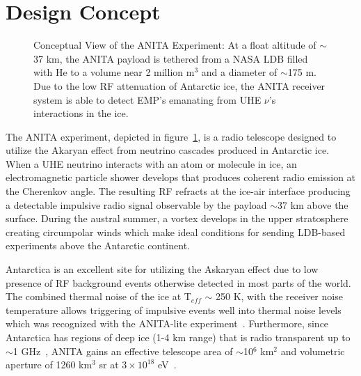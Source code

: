 \section{Design Concept}
\label{s:design}

\begin{figure}[htbp]
\centering
\epsfxsize=4.0in
\caption{Conceptual View of the ANITA Experiment:  At a float altitude of $\sim$37 km, the ANITA payload is tethered from a NASA LDB filled with He to a volume near 2 million m$^3$ and a diameter of $\sim$175 m.  Due to the low RF attenuation of Antarctic ice, the ANITA receiver system is able to detect EMP's emanating from UHE $\nu$'s interactions in the ice.}
\label{fig:anitaConcept}
\end{figure}

The ANITA experiment, depicted in figure~\ref{fig:anitaConcept}, is a radio telescope designed to utilize the Akaryan effect from neutrino cascades produced in Antarctic ice.  When a UHE neutrino interacts with an atom or molecule in ice, an electromagnetic particle shower develops that produces coherent radio emission at the Cherenkov angle.  The resulting RF refracts at the ice-air interface producing a detectable impulsive radio signal observable by the payload $\sim$37 km above the surface.  During the austral summer, a vortex develops in the upper stratosphere creating circumpolar winds which make ideal conditions for sending LDB-based experiments above the Antarctic continent.

\par Antarctica is an excellent site for utilizing the Askaryan effect due to low presence of RF background events otherwise detected in most parts of the world.  The combined thermal noise of the ice at T$_{eff}$ $\sim$ 250 K, with the receiver noise temperature allows triggering of impulsive events well into thermal noise levels which was recognized with the ANITA-lite experiment~\cite{ANITA.2006}.  Furthermore, since Antarctica has regions of deep ice (1-4 km range) that is radio transparent up to $\sim$1 GHz~\cite{Barwick.2005}, ANITA gains an effective telescope area of $\sim$10$^6$ km$^2$ and volumetric aperture of 1260 km$^3$ sr at $3 \times 10^{18}$ eV~\cite{ANITAprop.2003}.